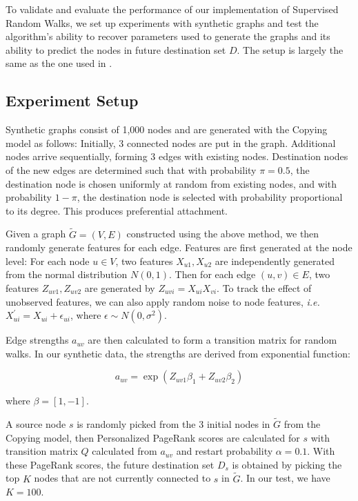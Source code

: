 \documentclass[10pt]{article}
\begin{document}
\begin{multicols}{2}
To validate and evaluate the performance of our implementation of Supervised Random Walks, we set up experiments with synthetic graphs and test the algorithm's ability to recover parameters used to generate the graphs and its ability to predict the nodes in future destination set $D$. The setup is largely the same as the one used in \cite{backstrom}.

\subsection{Experiment Setup}

Synthetic graphs consist of 1,000 nodes and are generated with the Copying model as follows: Initially, 3 connected nodes are put in the graph. Additional nodes arrive sequentially, forming 3 edges with existing nodes. Destination nodes of the new edges are determined such that with probability $\pi = 0.5$, the destination node is chosen uniformly at random from existing nodes, and with probability $1-\pi$, the destination node is selected with probability proportional to its degree. This produces preferential attachment.

Given a graph $\tilde{G} = (V, E)$ constructed using the above method, we then randomly generate features for each edge. Features are first generated at the node level: For each node $u \in V$, two features $X_{u1}, X_{u2}$ are independently generated from the normal distribution $N(0, 1)$. Then for each edge $(u, v) \in E$, two features $Z_{uv1}, Z_{uv2}$ are generated by $Z_{uvi} = X_{ui}X_{vi}$. To track the effect of unobserved features, we can also apply random noise to node features, \textit{i.e.} $X^{\prime}_{ui} = X_{ui} + \epsilon_{ui}$, where $\epsilon\sim N(0, \sigma^{2})$.

Edge strengths $a_{uv}$ are then calculated to form a transition matrix for random walks. In our synthetic data, the strengths are derived from exponential function:

\begin{displaymath}
a_{uv} = \exp\left( Z_{uv1}\beta_{1} + Z_{uv2}\beta_{2} \right)
\end{displaymath}

where $\beta = [1, -1]$.

A source node $s$ is randomly picked from the 3 initial nodes in $\tilde{G}$ from the Copying model, then Personalized PageRank scores are calculated for $s$ with transition matrix $Q$ calculated from $a_{uv}$ and restart probability $\alpha = 0.1$. With these PageRank scores, the future destination set $D_{s}$ is obtained by picking the top $K$ nodes that are not currently connected to $s$ in $\tilde{G}$. In our test, we have $K=100$.


\end{multicols}
\end{document}
